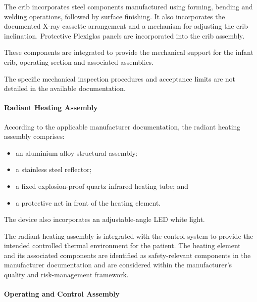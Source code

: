 The crib incorporates steel components manufactured using forming,
bending and welding operations, followed by surface finishing.
It also incorporates the documented X-ray cassette arrangement and
a mechanism for adjusting the crib inclination. Protective
Plexiglas panels are incorporated into the crib assembly.

These components are integrated to provide the mechanical support
for the infant crib, operating section and associated assemblies.

The specific mechanical inspection procedures and acceptance limits
are not detailed in the available documentation.


\paragraph{Radiant Heating Assembly}

According to the applicable manufacturer documentation, the
radiant heating assembly comprises:

\begin{itemize}
    \item an aluminium alloy structural assembly;
    \item a stainless steel reflector;
    \item a fixed explosion-proof quartz infrared heating tube; and
    \item a protective net in front of the heating element.
\end{itemize}

The device also incorporates an adjustable-angle LED white light.

The radiant heating assembly is integrated with the control system
to provide the intended controlled thermal environment for the
patient. The heating element and its associated components are
identified as safety-relevant components in the manufacturer
documentation and are considered within the manufacturer's quality
and risk-management framework.


\paragraph{Operating and Control Assembly}

